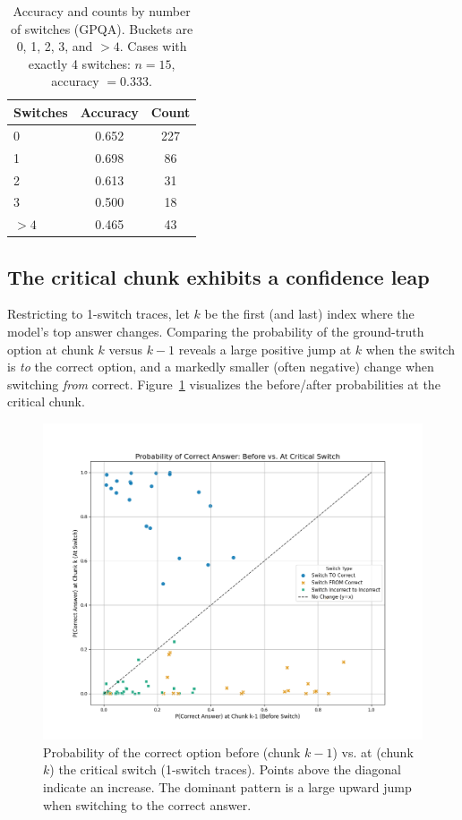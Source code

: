 \documentclass{article}
\begin{document}
\begin{table}[t]
    \centering
    \caption{Accuracy and counts by number of switches (GPQA). Buckets are 0, 1, 2, 3, and $>4$. Cases with exactly 4 switches: $n=15$, accuracy $=0.333$.}
    \label{tab:acc_by_switches}
    \begin{tabular}{lcc}
    \hline
    Switches & Accuracy & Count \\
    \hline
    0  & 0.652 & 227 \\
    1  & 0.698 &  86 \\
    2  & 0.613 &  31 \\
    3  & 0.500 &  18 \\
    $>4$ & 0.465 &  43 \\
    \hline
    \end{tabular}
\end{table}

\subsection{The critical chunk exhibits a confidence leap}
Restricting to 1-switch traces, let $k$ be the first (and last) index where the model’s top answer changes. Comparing the probability of the ground-truth option at chunk $k$ versus $k{-}1$ reveals a large positive jump at $k$ when the switch is \emph{to} the correct option, and a markedly smaller (often negative) change when switching \emph{from} correct. Figure~\ref{fig:prob_change_scatter} visualizes the before/after probabilities at the critical chunk.

\begin{figure}[t]
    \centering
    \includegraphics[width=0.75\linewidth]{analysis_results/critical_chunk_prob_change/prob_change_scatter_reasoning_traces_gpqa_Qwen_Qwen3-32B.png}
    \caption{Probability of the correct option before (chunk $k{-}1$) vs. at (chunk $k$) the critical switch (1-switch traces). Points above the diagonal indicate an increase. The dominant pattern is a large upward jump when switching to the correct answer.}
    \label{fig:prob_change_scatter}
\end{figure}
\end{document}
